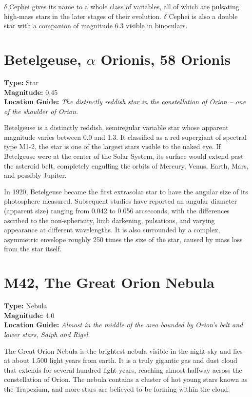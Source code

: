 $\delta$ Cephei gives its name to a whole class of variables, all of
which are pulsating high-mass stars in the later stages of their
evolution. $\delta$ Cephei is also a double star with a companion of
magnitude 6.3 visible in binoculars.

\section{Betelgeuse, \texorpdfstring{$\alpha$}{alpha} Orionis, 58 Orionis}
\textbf{Type:} Star \\
\textbf{Magnitude:} 0.45 \\
\textbf{Location Guide:} \textit{The distinctly reddish star in the constellation of Orion -- one of the shoulder of Orion.} 

Betelgeuse is a distinctly reddish, semiregular variable star whose apparent magnitude varies between 0.0 and 1.3. It classified as a red supergiant of spectral type M1-2, the star is one of the largest stars visible to the naked eye. If Betelgeuse were at the center of the Solar System, its surface would extend past the asteroid belt, completely engulfing the orbits of Mercury, Venus, Earth, Mars, and possibly Jupiter.

In 1920, Betelgeuse became the first extrasolar star to have the angular size of its photosphere measured. Subsequent studies have reported an angular diameter (apparent size) ranging from 0.042 to 0.056 arcseconds, with the differences ascribed to the non-sphericity, limb darkening, pulsations, and varying appearance at different wavelengths. It is also surrounded by a complex, asymmetric envelope roughly 250 times the size of the star, caused by mass loss from the star itself.  

\section{M42, The Great Orion Nebula} 
\textbf{Type:} Nebula \\
\textbf{Magnitude:} 4.0 \\
\textbf{Location Guide:} \textit{Almost in the middle of the area bounded by Orion's belt and lower stars, Saiph and Rigel.} 

The Great Orion Nebula is the brightest nebula visible in the night
sky and lies at about 1.500 light years from earth. It is a truly
gigantic gas and dust cloud that extends for several hundred light
years, reaching almost halfway across the constellation of Orion. The
nebula contains a cluster of hot young stars known as the Trapezium,
and more stars are believed to be forming within the cloud.

